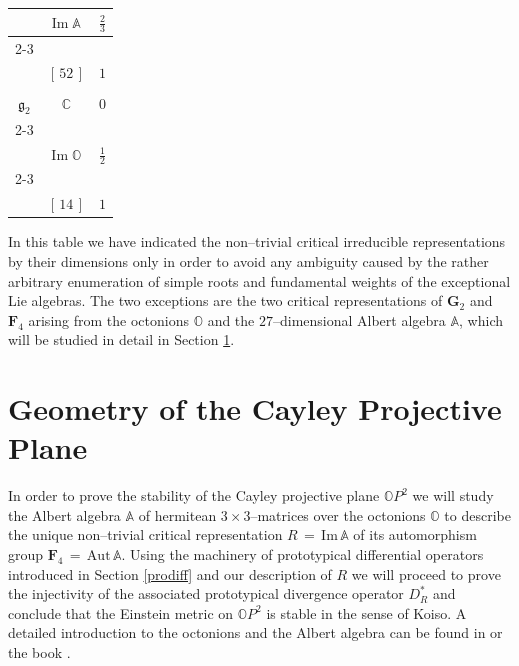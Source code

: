 \documentclass[12pt]{article}
\def\A{\mathbb{A}}
\def\Aut{\mathrm{Aut}}
\def\C{\mathbb{C}}
\def\F{\mathbf{F}}
\def\Im{\mathrm{Im}}
\def\O{\mathbb{O}}
\begin{document}
\begin{center}
\begin{tabular}[t]{| c | c | c |}
   & $\mathrm{Im}\;\A$ & $\frac23$
   \\[3pt]
   \cline{2-3}&&
   \\[-10pt]
   & $[\,52\,]$ & $1$
   \\[3pt]
   \hline\hline&&
   \\[-10pt]
   $\mathfrak{g}_2$ & $\C$ & $0$
   \\[3pt]
   \cline{2-3}&&
   \\[-10pt]
   & $\mathrm{Im}\;\O$ & $\frac12$
   \\[3pt]
   \cline{2-3}&&
   \\[-10pt]
   & $[\,14\,]$ & $1$
   \\[3pt]
   \hline
  \end{tabular}
 \end{center}
 In this table we have indicated the non--trivial critical irreducible
 representations by their dimensions only in order to avoid any ambiguity
 caused by the rather arbitrary enumeration of simple roots and fundamental
 weights of the exceptional Lie algebras. The two exceptions are the two
 critical representations of $\mathbf{G}_2$ and $\F_4$ arising from the
 octonions $\O$ and the $27$--dimensional Albert algebra $\A$, which will
 be studied in detail in Section \ref{geocay}.
%
\section{Geometry of the Cayley Projective Plane}
\label{geocay}
%
 In order to prove the stability of the Cayley projective plane $\O P^2$
 we will study the Albert algebra $\A$ of hermitean $3\times3$--matrices
 over the octonions $\O$ to describe the unique non--trivial critical
 representation $R\,=\,\Im\,\A$ of its automorphism group $\F_4\,=\,\Aut\,\A$.
 Using the machinery of prototypical differential operators introduced in
 Section \ref{prodiff} and our description of $R$ we will proceed to prove
 the injectivity of the associated prototypical divergence operator $D^*_R$
 and conclude that the Einstein metric on $\O P^2$ is stable in the sense
 of Koiso. A detailed introduction to the octonions and the Albert algebra
 can be found in \cite{baez} or the book \cite{harvey}.
\end{document}
